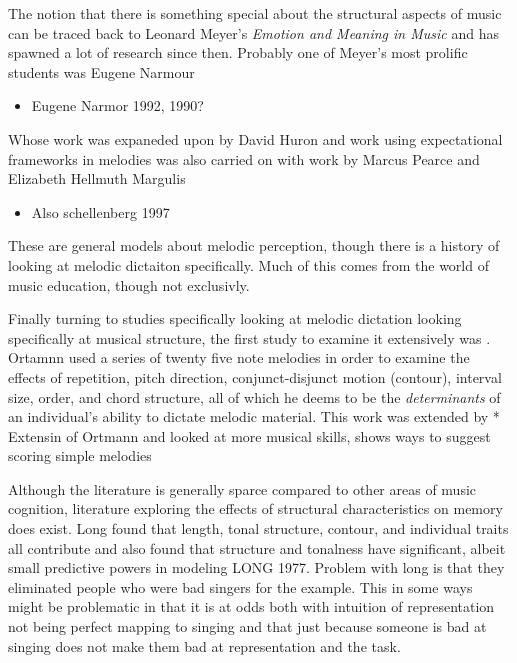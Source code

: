 \documentclass[]{book}
\providecommand{\tightlist}{%
  \setlength{\itemsep}{0pt}\setlength{\parskip}{0pt}}
\theoremstyle{definition}
\theoremstyle{definition}
\theoremstyle{definition}
\theoremstyle{remark}
\begin{document}
The notion that there is something special about the structural aspects
of music can be traced back to Leonard Meyer's \emph{Emotion and Meaning
in Music} \citep{meyerEmotionMeaningMusic1956} and has spawned a lot of
research since then. Probably one of Meyer's most prolific students was
Eugene Narmour

\begin{itemize}
\tightlist
\item
  Eugene Narmor 1992, 1990?
\end{itemize}

Whose work was expaneded upon by David Huron
\citep{huronSweetAnticipation2006} and work using expectational
frameworks in melodies was also carried on with work by Marcus Pearce
\citep{pearceAuditoryExpectationInformation2012} and Elizabeth Hellmuth
Margulis \citep{margulisModelMelodicExpectation2005}

\begin{itemize}
\tightlist
\item
  Also schellenberg 1997
\end{itemize}

These are general models about melodic perception, though there is a
history of looking at melodic dictaiton specifically. Much of this comes
from the world of music education, though not exclusivly.

Finally turning to studies specifically looking at melodic dictation
looking specifically at musical structure, the first study to examine it
extensively was \citep{ortmannTonalDeterminantsMelodic1933}. Ortamnn
used a series of twenty five note melodies in order to examine the
effects of repetition, pitch direction, conjunct-disjunct motion
(contour), interval size, order, and chord structure, all of which he
deems to be the \emph{determinants} of an individual's ability to
dictate melodic material. This work was extended by *
\citep{taylorStrategiesMemoryShort1983} Extensin of Ortmann and looked
at more musical skills, shows ways to suggest scoring simple melodies

Although the literature is generally sparce compared to other areas of
music cognition, literature exploring the effects of structural
characteristics on memory does exist. Long found that length, tonal
structure, contour, and individual traits all contribute and also found
that structure and tonalness have significant, albeit small predictive
powers in modeling LONG 1977. Problem with long is that they eliminated
people who were bad singers for the example. This in some ways might be
problematic in that it is at odds both with intuition of representation
not being perfect mapping to singing
\citep{pfordresherPoorPitchSingingAbsence2007} and that just because
someone is bad at singing does not make them bad at representation and
the task.
\end{document}
